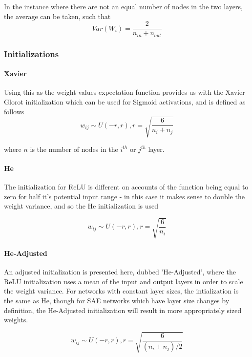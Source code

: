 \documentclass[a4paper,latin]{paper}
\begin{document}
In the instance where there are not an equal number of nodes in the two layers, the average can be taken, such that
 \begin{equation}
Var(W_i) = \frac{2}{n_{in} + n_{out}}
\end{equation}

\subsubsection{Initializations}

\paragraph{Xavier} Using this as the weight values expectation function provides us with the Xavier Glorot initialization \cite{Glorot} which can be used for Sigmoid activations, and is defined as follows
\begin{equation}
w_{ij} \sim U(-r, r), r = \sqrt{\frac{6}{n_i + n_j}}
\end{equation}

where $n$ is the number of nodes in the $i^{th}$ or $j^{th}$ layer.
\newline\newline
\paragraph{He} The initialization for ReLU is different on accounts of the function being equal to zero for half it's potential input range - in this case it makes sense to double the weight variance, and so the He \cite{He} initialization is used

\begin{equation}
w_{ij} \sim U(-r, r), r = \sqrt{\frac{6}{n_i}}
\end{equation}


\paragraph{He-Adjusted} An adjusted initialization is presented here, dubbed 'He-Adjusted', where the ReLU initialization uses a mean of the input and output layers in order to scale the weight variance. For networks with constant layer sizes, the intialization is the same as He, though for SAE networks which have layer size changes by definition, the He-Adjusted initialization will result in more appropriately sized weights.

\begin{equation}
w_{ij} \sim U(-r, r), r = \sqrt{\frac{6}{(n_i + n_j)/2}}
\end{equation}
\end{document}
